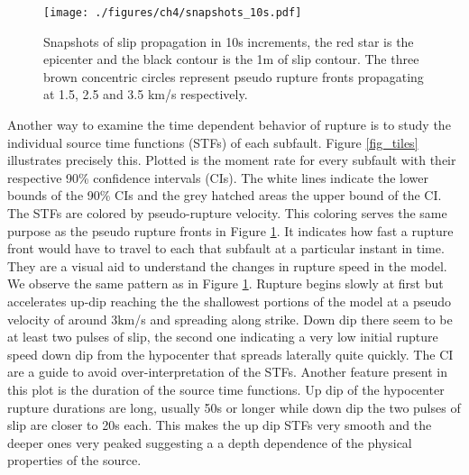 \begin{figure}[!ht] 
  \centering
  \texttt{[image: ./figures/ch4/snapshots\_10s.pdf]}
    \caption[Model snapshots]{Snapshots of slip propagation in 10s increments, the red star is the epicenter and the black contour is the 1m of slip contour. The three brown concentric circles represent pseudo rupture fronts propagating at 1.5, 2.5 and 3.5 km/s respectively.}
  \label{fig_snapshots}
\end{figure}

Another way to examine the time dependent behavior of rupture is to study the individual source time functions (STFs) of each subfault. Figure \ref{fig_tiles} illustrates precisely this. Plotted is the moment rate for every subfault with their respective 90\% confidence intervals (CIs). The white lines indicate the lower bounds of the 90\% CIs and the grey hatched areas the upper bound of the CI. The STFs are colored by pseudo-rupture velocity. This coloring serves the same purpose as the pseudo rupture fronts in Figure \ref{fig_snapshots}. It indicates how fast a rupture front would have to travel to each that subfault at a particular instant in time. They are a visual aid to understand the changes in rupture speed in the model. We observe the same pattern as in Figure \ref{fig_snapshots}. Rupture begins slowly at first but accelerates up-dip reaching the the shallowest portions of the model at a pseudo velocity of around 3km/s and spreading along strike. Down dip there seem to be at least two pulses of slip, the second one indicating a very low initial rupture speed down dip from the hypocenter that spreads laterally quite quickly. The CI are a guide to avoid over-interpretation of the STFs. Another feature present in this plot is the duration of the source time functions. Up dip of the hypocenter rupture durations are long, usually 50s or longer while down dip the two pulses of slip are closer to 20s each. This makes the up dip STFs very smooth and the deeper ones very peaked suggesting a a depth dependence of the physical properties of the source.


